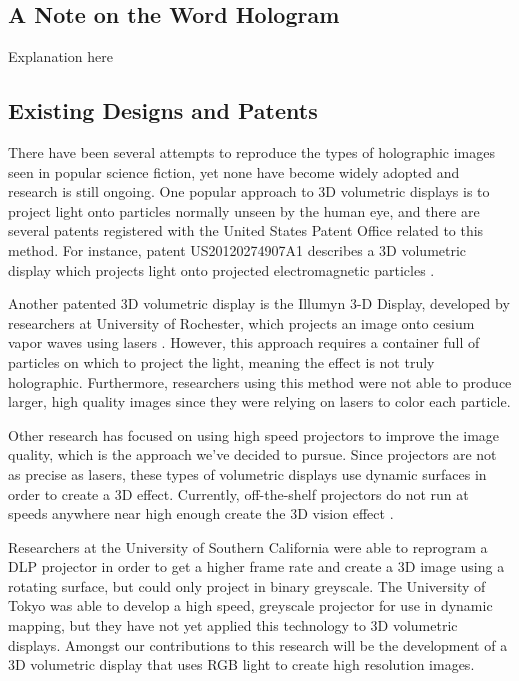 \documentclass[12pt]{article}
\begin{document}
\subsection{A Note on the Word Hologram}
Explanation here

\subsection{Existing Designs and Patents}
There have been several attempts to reproduce the types of holographic images seen in popular science fiction, yet none have become widely adopted and research is still ongoing. One popular approach to 3D volumetric displays is to project light onto particles normally unseen by the human eye, and there are several patents registered with the United States Patent Office related to this method. For instance, patent US20120274907A1 describes a 3D volumetric display which projects light onto projected electromagnetic particles \cite{berkley_feldt}.

Another patented 3D volumetric display is the Illumyn 3-D Display, developed by researchers at University of Rochester, which projects an image onto cesium vapor waves using lasers \cite{Blundell2017}. However, this approach requires a container full of particles on which to project the light, meaning the effect is not truly holographic. Furthermore, researchers using this method were not able to produce larger, high quality images since they were relying on lasers to color each particle. 

Other research has focused on using high speed projectors to improve the image quality, which is the approach we've decided to pursue. Since projectors are not as precise as lasers, these types of volumetric displays use dynamic surfaces in order to create a 3D effect. Currently, off-the-shelf projectors do not run at speeds anywhere near high enough create the 3D vision effect \cite{babraham123}.

Researchers at the University of Southern California were able to reprogram a DLP projector in order to get a higher frame rate and create a 3D image using a rotating surface, but could only project in binary greyscale. The University of Tokyo was able to develop a high speed, greyscale projector for use in dynamic mapping, but they have not yet applied this technology to 3D volumetric displays. Amongst our contributions to this research will be the development of a 3D volumetric display that uses RGB light to create high resolution images.
\end{document}
